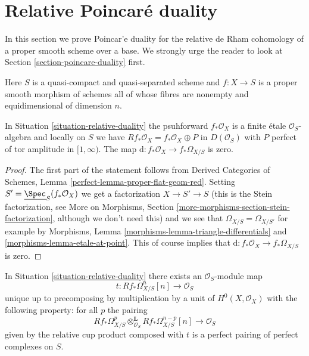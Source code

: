 \section{Relative Poincar\'e duality}
\label{section-relative-poincare-duality}

\noindent
In this section we prove Poincar'e duality for the relative de Rham cohomology
of a proper smooth scheme over a base. We strongly urge the reader to
look at Section \ref{section-poincare-duality} first.

\begin{situation}
\label{situation-relative-duality}
Here $S$ is a quasi-compact and quasi-separated scheme and
$f : X \to S$ is a proper smooth morphism of schemes all of whose
fibres are nonempty and equidimensional of dimension $n$.
\end{situation}

\begin{lemma}
\label{lemma-relative-bottom-part-degenerates}
In Situation \ref{situation-relative-duality} the psuhforward
$f_*\mathcal{O}_X$ is a finite \'etale $\mathcal{O}_S$-algebra
and locally on $S$ we have $Rf_*\mathcal{O}_X = f_*\mathcal{O}_X \oplus P$
in $D(\mathcal{O}_S)$ with $P$ perfect of tor amplitude in $[1, \infty)$.
The map $\text{d} : f_*\mathcal{O}_X \to f_*\Omega_{X/S}$ is zero.
\end{lemma}

\begin{proof}
The first part of the statement follows from
Derived Categories of Schemes, Lemma \ref{perfect-lemma-proper-flat-geom-red}.
Setting $S' = \underline{\Spec}_S(f_*\mathcal{O}_X)$ we get a factorization
$X \to S' \to S$ (this is the Stein factorization, see
More on Morphisms, Section \ref{more-morphisms-section-stein-factorization},
although we don't need this)
and we see that $\Omega_{X/S} = \Omega_{X/S'}$ for example by
Morphisms, Lemma \ref{morphisms-lemma-triangle-differentials} and
\ref{morphisms-lemma-etale-at-point}. This of course implies that
$\text{d} : f_*\mathcal{O}_X \to f_*\Omega_{X/S}$ is zero.
\end{proof}

\begin{lemma}
\label{lemma-relative-duality-hodge}
In Situation \ref{situation-relative-duality} there exists an
$\mathcal{O}_S$-module map
$$
t : Rf_*\Omega^n_{X/S}[n] \longrightarrow \mathcal{O}_S
$$
unique up to precomposing by multiplication by a unit of
$H^0(X, \mathcal{O}_X)$ with the following property: for all $p$ the pairing
$$
Rf_*\Omega^p_{X/S}
\otimes_{\mathcal{O}_S}^\mathbf{L}
Rf_*\Omega^{n - p}_{X/S}[n]
\longrightarrow
\mathcal{O}_S
$$
given by the relative cup product composed with $t$
is a perfect pairing of perfect complexes on $S$.
\end{lemma}

